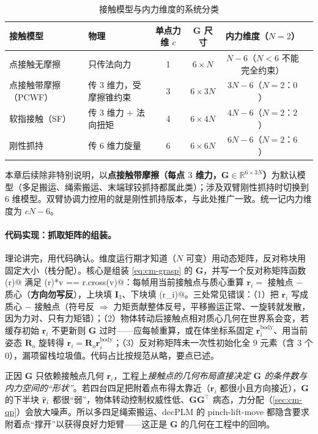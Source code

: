 \begin{table}[H]\centering\small
\caption{接触模型与内力维度的系统分类}
\label{tab:cm-contact-models}
\begin{tabular}{p{3.0cm}p{3.2cm}cccp{2.6cm}}
\toprule
接触模型 & 物理 & 单点力维 $c$ & $\mathbf{G}$ 尺寸 & 内力维度（$N{=}2$） \\
\midrule
点接触无摩擦 & 只传法向力 & 1 & $6\times N$ & $N-6$（$N{<}6$ 不能完全约束） \\
点接触带摩擦（PCWF） & 传 $3$ 维力，受摩擦锥约束 & 3 & $6\times 3N$ & $3N-6$（$N{=}2$：$0$） \\
软指接触（SF） & 传 $3$ 维力 $+$ 法向扭矩 & 4 & $6\times 4N$ & $4N-6$（$N{=}2$：$2$） \\
刚性抓持 & 传 $6$ 维力旋量 & 6 & $6\times 6N$ & $6N-6$（$N{=}2$：$6$） \\
\bottomrule
\end{tabular}
\end{table}

\noindent 本章后续除非特别说明，以\textbf{点接触带摩擦（每点 $3$ 维力，$\mathbf{G}\in\mathbb{R}^{6\times 3N}$）}为默认模型（多足搬运、绳索搬运、末端球铰抓持都属此类）；涉及双臂刚性抓持时切换到 $6$ 维模型。双臂协调力控用的就是刚性抓持版本，与此处推广一致。统一记内力维度为 $cN-6$。

\paragraph{代码实现：抓取矩阵的组装。}
理论讲完，用代码确认。维度运行期才知道（$N$ 可变）用动态矩阵，反对称块用固定大小（栈分配）。核心是组装 \cref{eq:cm-grasp} 的 $\mathbf{G}$，并写一个反对称矩阵函数 \verb@skew(r)@ 满足 \verb@skew(r)*v == r.cross(v)@：每帧用当前接触点与质心重算 $\mathbf{r}_i=$ 接触点 $-$ 质心（\textbf{方向勿写反}），上块填 $\mathbf{I}_3$、下块填 \verb@skew(r_i)@。三处常见错误：（1）把 $\mathbf{r}_i$ 写成 质心 $-$ 接触点（符号反 $\Rightarrow$ 力矩贡献整体反号，平移搬运正常、一旋转就发散，因为力对、只有力矩错）；（2）物体转动后接触点相对质心几何在世界系会变，若缓存初始 $\mathbf{r}_i$ 不更新则 $\mathbf{G}$ 过时——应每帧重算，或在体坐标系固定 $\mathbf{r}_i^{\text{body}}$、用当前姿态 $\mathbf{R}_o$ 旋转得 $\mathbf{r}_i=\mathbf{R}_o\mathbf{r}_i^{\text{body}}$；（3）反对称矩阵未一次性初始化全 $9$ 元素（含 $3$ 个 $0$），漏项留栈垃圾值。代码占比按规范从略，要点已述。

\begin{insight}[抓取矩阵的几何决定工程性能]
正因 $\mathbf{G}$ 只依赖接触点几何 $\mathbf{r}_i$，工程上\emph{接触点的几何布局直接决定 $\mathbf{G}$ 的条件数与内力空间的“形状”}。若四台四足把附着点布得太靠近（$\mathbf{r}_i$ 都很小且方向接近），$\mathbf{G}$ 的下半块 $\widehat{\mathbf{r}}_i$ 都很“弱”，物体转动控制权威性低、$\mathbf{G}\mathbf{G}^\top$ 病态，力分配（\cref{sec:cm-qp}）会放大噪声。所以多四足绳索搬运、decPLM 的 pinch-lift-move 都隐含要求附着点“撑开”以获得良好力矩臂——这正是 $\mathbf{G}$ 的几何在工程中的回响。
\end{insight}


